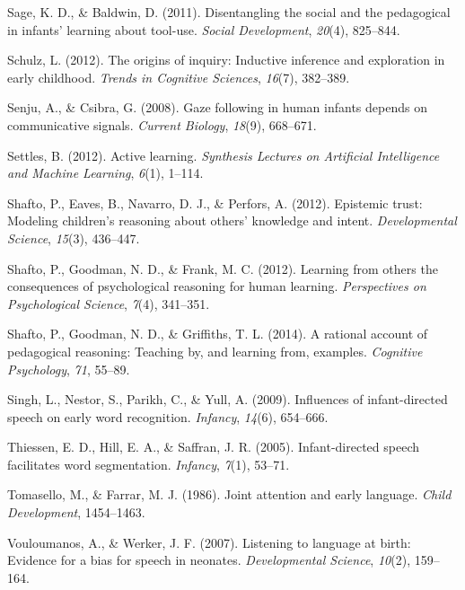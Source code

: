 \documentclass[a4paper,man,apacite,floatsintext]{apa6}
\begin{document}
\hypertarget{ref-sage2011disentangling}{}
Sage, K. D., \& Baldwin, D. (2011). Disentangling the social and the
pedagogical in infants' learning about tool-use. \emph{Social
Development}, \emph{20}(4), 825--844.

\hypertarget{ref-schulz2012origins}{}
Schulz, L. (2012). The origins of inquiry: Inductive inference and
exploration in early childhood. \emph{Trends in Cognitive Sciences},
\emph{16}(7), 382--389.

\hypertarget{ref-senju2008gaze}{}
Senju, A., \& Csibra, G. (2008). Gaze following in human infants depends
on communicative signals. \emph{Current Biology}, \emph{18}(9),
668--671.

\hypertarget{ref-settles2012active}{}
Settles, B. (2012). Active learning. \emph{Synthesis Lectures on
Artificial Intelligence and Machine Learning}, \emph{6}(1), 1--114.

\hypertarget{ref-shafto2012epistemic}{}
Shafto, P., Eaves, B., Navarro, D. J., \& Perfors, A. (2012). Epistemic
trust: Modeling children's reasoning about others' knowledge and intent.
\emph{Developmental Science}, \emph{15}(3), 436--447.

\hypertarget{ref-shafto2012learning}{}
Shafto, P., Goodman, N. D., \& Frank, M. C. (2012). Learning from others
the consequences of psychological reasoning for human learning.
\emph{Perspectives on Psychological Science}, \emph{7}(4), 341--351.

\hypertarget{ref-shafto2014rational}{}
Shafto, P., Goodman, N. D., \& Griffiths, T. L. (2014). A rational
account of pedagogical reasoning: Teaching by, and learning from,
examples. \emph{Cognitive Psychology}, \emph{71}, 55--89.

\hypertarget{ref-singh2009influences}{}
Singh, L., Nestor, S., Parikh, C., \& Yull, A. (2009). Influences of
infant-directed speech on early word recognition. \emph{Infancy},
\emph{14}(6), 654--666.

\hypertarget{ref-thiessen2005infant}{}
Thiessen, E. D., Hill, E. A., \& Saffran, J. R. (2005). Infant-directed
speech facilitates word segmentation. \emph{Infancy}, \emph{7}(1),
53--71.

\hypertarget{ref-tomasello1986joint}{}
Tomasello, M., \& Farrar, M. J. (1986). Joint attention and early
language. \emph{Child Development}, 1454--1463.

\hypertarget{ref-vouloumanos2007listening}{}
Vouloumanos, A., \& Werker, J. F. (2007). Listening to language at
birth: Evidence for a bias for speech in neonates. \emph{Developmental
Science}, \emph{10}(2), 159--164.
\end{document}
